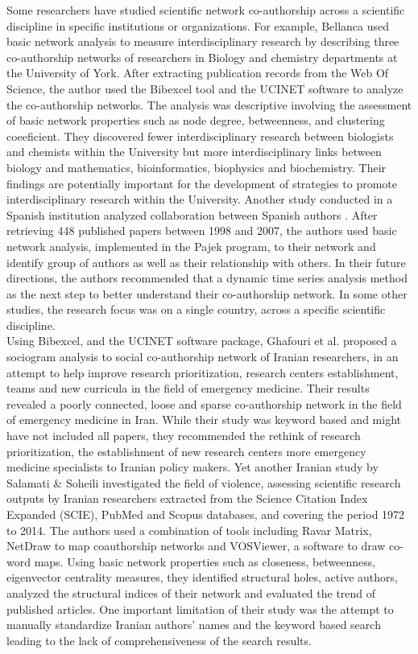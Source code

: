 Some researchers have studied scientific network co-authorship across a scientific discipline in specific institutions or organizations. For example, Bellanca \cite{bellanca_measuring_2009} used basic network analysis to measure interdisciplinary research by describing three co-authorship networks of researchers in Biology and chemistry departments at the University of York. After extracting publication records from the Web Of Science, the author used the Bibexcel tool and the UCINET software to analyze the co-authorship networks. The analysis was descriptive involving the assessment of basic network properties such as node degree, betweenness, and clustering coeeficient. They discovered fewer interdisciplinary research between biologists and chemists within the University but more interdisciplinary links between biology and mathematics, bioinformatics, biophysics and biochemistry. Their findings are potentially important for the development of strategies to promote interdisciplinary research within the University. Another study conducted in a Spanish institution analyzed collaboration between Spanish authors \cite{aleixandre-benavent_coauthorship_2008}. After retrieving 448 published papers between 1998 and 2007, the authors used basic network analysis, implemented in the Pajek program, to their network and identify group of authors as well as their relationship with others. In their future directions, the authors recommended that a dynamic time series analysis method as the next step to better understand their co-authorship network. %
In some other studies, the research focus was on a single country, across a specific scientific discipline. \\
Using Bibexcel, and the UCINET software package, Ghafouri et al. \cite{ghafouri_social_2014} proposed a sociogram analysis to social co-authorship network of Iranian researchers, in an attempt to help improve research prioritization, research centers establishment, teams and new curricula in the field of emergency medicine. Their results revealed a poorly connected, loose and sparse co-authorship network in the field of emergency medicine in Iran. While their study was keyword based and might have not included all papers, they recommended the rethink of research prioritization, the establishment of new research centers more emergency medicine specialists to Iranian policy makers. Yet another Iranian study by Salamati \& Soheili \cite{salamati_social_2016} investigated the field of violence, assessing scientific research outputs by Iranian researchers extracted from the Science Citation Index Expanded (SCIE), PubMed and Scopus databases, and covering the period 1972 to 2014. The authors used a combination of tools including Ravar Matrix, NetDraw to map coauthorship networks and VOSViewer, a software to draw co-word maps. Using basic network properties such as closeness, betweenness, eigenvector centrality measures, they identified structural holes, active authors, analyzed the structural indices of their network and evaluated the trend of published articles. One important limitation of their study was the attempt to manually standardize Iranian authors’ names and the keyword based search leading to the lack of comprehensiveness of the search results. \\
